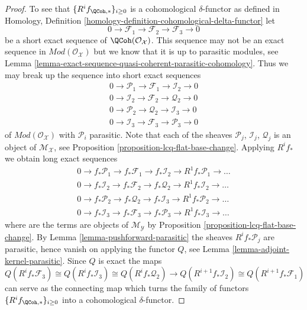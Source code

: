 \begin{proof}
\medskip\noindent
To see that $\{R^if_{\QCoh, *}\}_{i \geq 0}$ is a cohomological
$\delta$-functor as defined in
Homology, Definition \ref{homology-definition-cohomological-delta-functor}
let
$$
0 \to \mathcal{F}_1 \to \mathcal{F}_2 \to \mathcal{F}_3 \to 0
$$
be a short exact sequence of $\QCoh(\mathcal{O}_\mathcal{X})$.
This sequence may not be an exact sequence in
$\textit{Mod}(\mathcal{O}_\mathcal{X})$ but we know that it is
up to parasitic modules, see
Lemma \ref{lemma-exact-sequence-quasi-coherent-parasitic-cohomology}.
Thus we may break up the sequence into short exact sequences
$$
\begin{matrix}
0 \to \mathcal{P}_1 \to \mathcal{F}_1 \to \mathcal{I}_2 \to 0 \\
0 \to \mathcal{I}_2 \to \mathcal{F}_2 \to \mathcal{Q}_2 \to 0 \\
0 \to \mathcal{P}_2 \to \mathcal{Q}_2 \to \mathcal{I}_3 \to 0 \\
0 \to \mathcal{I}_3 \to \mathcal{F}_3 \to \mathcal{P}_3 \to 0
\end{matrix}
$$
of $\textit{Mod}(\mathcal{O}_\mathcal{X})$ with $\mathcal{P}_i$ parasitic.
Note that each of the sheaves
$\mathcal{P}_j$, $\mathcal{I}_j$, $\mathcal{Q}_j$ is an object of
$\mathcal{M}_\mathcal{X}$, see
Proposition \ref{proposition-lcq-flat-base-change}.
Applying $R^if_*$ we obtain long exact sequences 
$$
\begin{matrix}
0 \to f_*\mathcal{P}_1 \to f_*\mathcal{F}_1 \to f_*\mathcal{I}_2 \to
R^1f_*\mathcal{P}_1 \to \ldots \\
0 \to f_*\mathcal{I}_2 \to f_*\mathcal{F}_2 \to f_*\mathcal{Q}_2 \to
R^1f_*\mathcal{I}_2 \to \ldots \\
0 \to f_*\mathcal{P}_2 \to f_*\mathcal{Q}_2 \to f_*\mathcal{I}_3 \to
R^1f_*\mathcal{P}_2 \to \ldots \\
0 \to f_*\mathcal{I}_3 \to f_*\mathcal{F}_3 \to f_*\mathcal{P}_3 \to
R^1f_*\mathcal{I}_3 \to \ldots
\end{matrix}
$$
where are the terms are objects of $\mathcal{M}_\mathcal{Y}$ by
Proposition \ref{proposition-lcq-flat-base-change}.
By
Lemma \ref{lemma-pushforward-parasitic}
the sheaves $R^if_*\mathcal{P}_j$ are parasitic, hence vanish on applying
the functor $Q$, see
Lemma \ref{lemma-adjoint-kernel-parasitic}.
Since $Q$ is exact the maps
$$
Q(R^if_*\mathcal{F}_3)
\cong
Q(R^if_*\mathcal{I}_3)
\cong
Q(R^if_*\mathcal{Q}_2)
\rightarrow
Q(R^{i + 1}f_*\mathcal{I}_2)
\cong
Q(R^{i + 1}f_*\mathcal{F}_1)
$$
can serve as the connecting map which turns the family of functors
$\{R^if_{\QCoh, *}\}_{i \geq 0}$
into a cohomological $\delta$-functor.
\end{proof}

